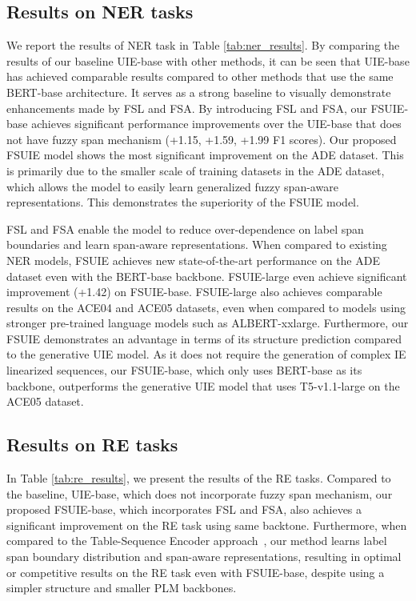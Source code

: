 \documentclass[11pt]{article}
\begin{document}
\subsection{Results on NER tasks}



We report the results of NER task in Table \ref{tab:ner_results}. By comparing the results of our baseline UIE-base with other methods, it can be seen that UIE-base has achieved comparable results compared to other methods that use the same BERT-base architecture. It serves as a strong baseline to visually demonstrate enhancements made by FSL and FSA. By introducing FSL and FSA, our FSUIE-base achieves significant performance improvements over the UIE-base that does not have fuzzy span mechanism (+1.15, +1.59, +1.99 F1 scores). 
Our proposed FSUIE model shows the most significant improvement on the ADE dataset. This is primarily due to the smaller scale of training datasets in the ADE dataset, which allows the model to easily learn generalized fuzzy span-aware representations. This demonstrates the superiority of the FSUIE model.





FSL and FSA enable the model to reduce over-dependence on label span boundaries and learn span-aware representations. When compared to existing NER models, FSUIE achieves new state-of-the-art performance on the ADE dataset even with the BERT-base backbone. FSUIE-large even achieve significant improvement (+1.42) on FSUIE-base. 
FSUIE-large also achieves comparable results on the ACE04 and ACE05 datasets, even when compared to models using stronger pre-trained language models such as ALBERT-xxlarge.
Furthermore, our FSUIE demonstrates an advantage in terms of its structure prediction compared to the generative UIE model. As it does not require the generation of complex IE linearized sequences, our FSUIE-base, which only uses BERT-base as its backbone, outperforms the generative UIE model that uses T5-v1.1-large on the ACE05 dataset.

 
\subsection{Results on RE tasks}




In Table \ref{tab:re_results}, we present the results of the RE tasks. Compared to the baseline, UIE-base, which does not incorporate fuzzy span mechanism, our proposed FSUIE-base, which incorporates FSL and FSA, also achieves a significant improvement on the RE task using same backtone. Furthermore, when compared to the Table-Sequence Encoder approach~\cite{wang-lu-2020-two}, our method learns label span boundary distribution and span-aware representations, resulting in optimal or competitive results on the RE task even with FSUIE-base, despite using a simpler structure and smaller PLM backbones.
\end{document}
